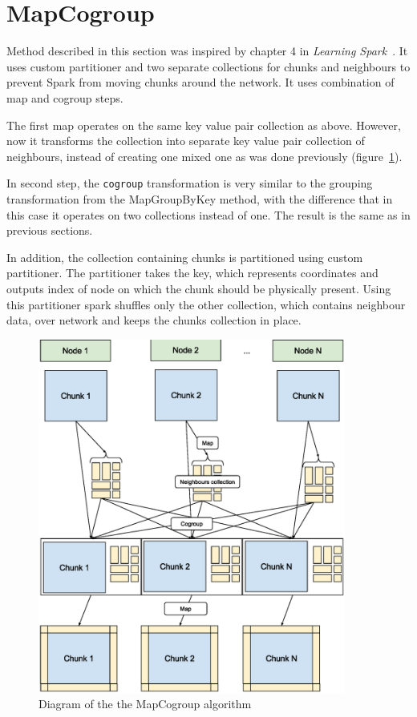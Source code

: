 \documentclass{l4proj}
\begin{document}
\section{MapCogroup}

Method described in this section was inspired by chapter 4 in \textit{Learning Spark}~\cite{learning_spark}.
It uses custom partitioner and two separate collections for chunks and neighbours
to prevent Spark from moving chunks around the network. It uses combination
of map and cogroup steps.

The first map operates on the same key value pair collection as above. However,
now it transforms the collection into separate key value pair collection of neighbours,
instead of creating one mixed one as was done previously (figure~\ref{fig:map_cogroup}).

In second step, the \texttt{cogroup} transformation is very similar to the grouping transformation
from the MapGroupByKey method, with the difference that in this case it operates on two collections 
instead of one. The result is the same as in previous sections.

In addition, the collection containing chunks is partitioned using custom partitioner.
The partitioner takes the key, which represents coordinates and outputs index of node
on which the chunk should be physically present. Using this partitioner spark
shuffles only the other collection, which contains neighbour data, over network and
keeps the chunks collection in place.

\begin{figure}
\centering
\includegraphics[width=0.9\textwidth]{images/MapCogroup.eps}
\caption{Diagram of the the MapCogroup algorithm}
\label{fig:map_cogroup}
\end{figure}
\end{document}
